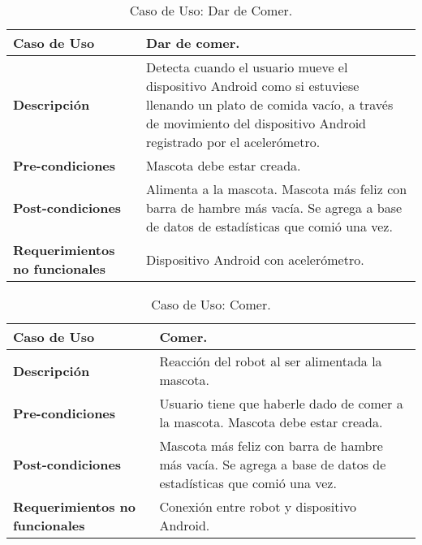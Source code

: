 \begin{table}[htbp!]
  \centering
  \begin{tabular}{|p{4cm}|p{6cm}|}\hline
    \bf{Caso de Uso}                   & Dar de comer. \\ \hline
    \bf{Descripci\'on}                 & Detecta cuando el usuario mueve el dispositivo Android como si estuviese llenando un plato de comida vac\'io, a trav\'es de movimiento del dispositivo Android registrado por el aceler\'ometro. \\ \hline
    \bf{Pre-condiciones}               & Mascota debe estar creada. \\ \hline
    \bf{Post-condiciones}              & Alimenta a la mascota. Mascota m\'as feliz con barra de hambre m\'as vac\'ia. Se agrega a base de datos de estad\'isticas que comi\'o una vez.   \\ \hline
    \bf{Requerimientos no funcionales} & Dispositivo Android con aceler\'ometro. \\ \hline
  \end{tabular}
  \caption[~Caso de Uso: Dar de Comer]{Caso de Uso: Dar de Comer.}
  \label{table:DarComer}
\end{table}

\begin{table}[htbp!]
  \centering
  \begin{tabular}{|p{4cm}|p{6cm}|}\hline
    \bf{Caso de Uso}                   & Comer. \\ \hline
    \bf{Descripci\'on}                 & Reacci\'on del robot al ser alimentada la mascota. \\ \hline
    \bf{Pre-condiciones}               & Usuario tiene que haberle dado de comer a la mascota. Mascota debe estar creada. \\ \hline
    \bf{Post-condiciones}              & Mascota m\'as feliz con barra de hambre m\'as vac\'ia. Se agrega a base de datos de estad\'isticas que comi\'o una vez. \\ \hline
    \bf{Requerimientos no funcionales} & Conexi\'on entre robot y dispositivo Android. \\ \hline
  \end{tabular}
  \caption[~~Caso de Uso: Comer]{Caso de Uso: Comer.}
  \label{table:Comer}
\end{table}


